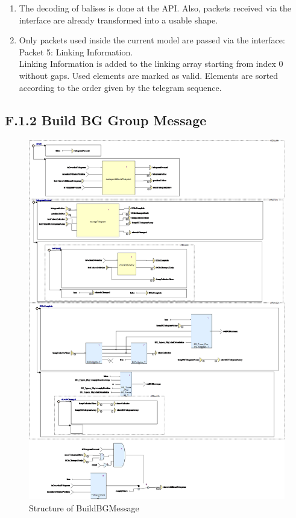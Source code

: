 \documentclass{template/openetcs_report}
\begin{document}
\begin{enumerate}
\item The decoding of balises is done at the API. Also, packets received via the interface are already transformed into a usable shape.
\item Only packets used inside the current model are passed via the interface:\\
Packet 5: Linking Information.\\
Linking Information is added to the linking array starting from index 0 without gaps. Used elements are marked as valid. Elements are sorted according to the order given by the telegram sequence.
\end{enumerate}



\subsection{F.1.2 Build BG Group Message}

\begin{figure}[hbtp]
\centering
\includegraphics[width=\textwidth]{../images/BuildBGMessage_diagram.png}
\caption{Structure of BuildBGMessage}
\end{figure}
\end{document}
